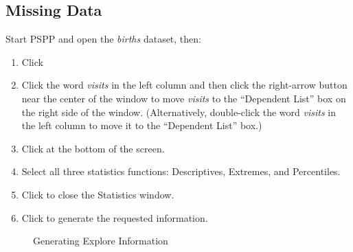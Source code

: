 \subsection{Missing Data}

Start \acs{PSPP} and open the \textit{births} dataset, then:

\begin{enumerate}
  \item Click \textsc{}
  \item Click the word \textit{visits} in the left column and then click the right-arrow button near the center of the window to move \textit{visits} to the ``Dependent List'' box on the right side of the window. (Alternatively, double-click the word \textit{visits} in the left column to move it to the ``Dependent List'' box.)
  \item Click \textsc{} at the bottom of the screen.
  \item Select all three statistics functions: Descriptives, Extremes, and Percentiles.
  \item Click  to close the Statistics window.
  \item Click  to generate the requested information.
\end{enumerate}

\begin{figure}[H]
  \begin{center}
    \caption{Generating Explore Information}
    \label{lab05_fig03}
  \end{center}
\end{figure}

